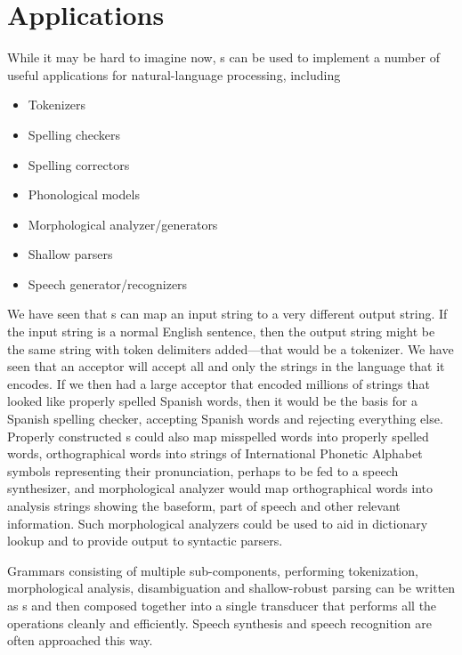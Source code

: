 \section{Applications}

While it may be hard to imagine now, \fsm{}s can be used to implement a number of useful
applications for natural-language processing, including

\begin{itemize}
\item
Tokenizers
\item
Spelling checkers
\item
Spelling correctors
\item
Phonological models
\item
Morphological analyzer/generators
\item
Shallow parsers
\item
Speech generator/recognizers
\end{itemize}

We have seen that \fst{}s can map an input string to a very different output string.  If
the input string is a normal English sentence, then the output string might be the same
string with token delimiters added---that would be a tokenizer.  We have seen that an
acceptor will accept all and only the strings in the language that it encodes.  If we then
had a large acceptor that encoded millions of strings that looked like properly spelled Spanish words, then
it would be the basis for a Spanish spelling checker, accepting Spanish words and rejecting
everything else.  Properly constructed \fst{}s could also map misspelled words into properly
spelled words, orthographical words into
strings of International Phonetic Alphabet symbols representing their pronunciation,
perhaps to be fed to a speech synthesizer, and
morphological analyzer  would map orthographical words into analysis strings showing
the baseform, part of speech and other relevant information.  Such morphological analyzers
could be used to aid in dictionary lookup and to provide output to syntactic parsers.

Grammars consisting of multiple sub-components, performing tokenization, morphological
analysis, disambiguation and shallow-robust parsing can be written as \fst{}s and then
composed together into a single transducer that performs all the operations cleanly and
efficiently.  Speech synthesis and speech recognition are often approached this way.

